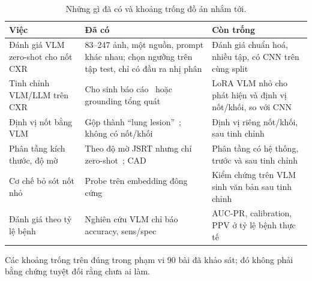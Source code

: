 \begin{table}[H]
\centering
\caption{Những gì đã có và khoảng trống đồ án nhắm tới.}
\label{tab:gap}
\small
\begin{tabularx}{\textwidth}{@{}p{3.2cm} L L@{}}
\toprule
\textbf{Việc} & \textbf{Đã có} & \textbf{Còn trống} \\
\midrule
Đánh giá VLM zero-shot cho nốt CXR & 83--247 ảnh, một nguồn, prompt khác nhau; \cite{khovanova2026comparative}
chọn ngưỡng trên tập test, \cite{nishio2026zeroshot} chỉ có đầu ra nhị phân & Đánh giá chuẩn hoá, nhiều tập, có CNN
trên cùng split \\
\addlinespace
Tinh chỉnh VLM/LLM trên CXR & Cho sinh báo cáo~\cite{volkov2025lora,gao2026s2d} hoặc grounding tổng
quát~\cite{xu2025medground} & LoRA VLM nhỏ cho phát hiện và định vị nốt/khối, so với CNN \\
\addlinespace
Định vị nốt bằng VLM & Gộp thành ``lung lesion''~\cite{gosai2025beyond}; không có nốt/khối~\cite{choi2026chexpercept}
& Định vị riêng nốt/khối, sau tinh chỉnh \\
\addlinespace
Phân tầng kích thước, độ mờ & Theo độ mờ JSRT nhưng chỉ zero-shot~\cite{nishio2026zeroshot}; CAD~\cite{pesce2019lesion,kim2020matrix}
& Phân tầng có hệ thống, trước và sau tinh chỉnh \\
\addlinespace
Cơ chế bỏ sót nốt nhỏ & Probe trên embedding đông cứng~\cite{muthyala2026frozen} & Kiểm chứng trên VLM sinh văn bản sau tinh chỉnh \\
\addlinespace
Đánh giá theo tỷ lệ bệnh & Nghiên cứu VLM chỉ báo accuracy, sens/spec & AUC-PR, calibration, PPV ở tỷ lệ bệnh thực tế \\
\bottomrule
\end{tabularx}
\end{table}

Các khoảng trống trên đúng trong phạm vi 90 bài đã khảo sát; đó không phải bằng chứng tuyệt đối rằng chưa ai làm.
